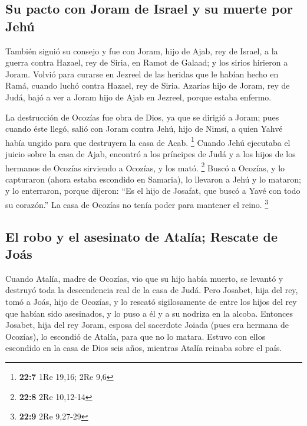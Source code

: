 \begin{paracol}{2}
{\subsection{Su pacto con Joram de Israel y su muerte por
Jehú}\label{su-pacto-con-joram-de-israel-y-su-muerte-por-jehuxfa}}

 También siguió su consejo y fue con Joram, hijo de Ajab,
rey de Israel, a la guerra contra Hazael, rey de Siria, en Ramot de
Galaad; y los sirios hirieron a Joram.  Volvió para
curarse en Jezreel de las heridas que le habían hecho en Ramá, cuando
luchó contra Hazael, rey de Siria. Azarías hijo de Joram, rey de Judá,
bajó a ver a Joram hijo de Ajab en Jezreel, porque estaba enfermo.

 La destrucción de Ocozías fue obra de Dios, ya que se
dirigió a Joram; pues cuando éste llegó, salió con Joram contra Jehú,
hijo de Nimsí, a quien Yahvé había ungido para que destruyera la casa de
Acab. \footnote{\textbf{22:7} 1Re 19,16; 2Re 9,6}  Cuando
Jehú ejecutaba el juicio sobre la casa de Ajab, encontró a los príncipes
de Judá y a los hijos de los hermanos de Ocozías sirviendo a Ocozías, y
los mató. \footnote{\textbf{22:8} 2Re 10,12-14}  Buscó a
Ocozías, y lo capturaron (ahora estaba escondido en Samaria), lo
llevaron a Jehú y lo mataron; y lo enterraron, porque dijeron: ``Es el
hijo de Josafat, que buscó a Yavé con todo su corazón.'' La casa de
Ocozías no tenía poder para mantener el reino. \footnote{\textbf{22:9}
  2Re 9,27-29}

\hypertarget{el-robo-y-el-asesinato-de-ataluxeda-rescate-de-jouxe1s}{%
\subsection{El robo y el asesinato de Atalía; Rescate de
Joás}\label{el-robo-y-el-asesinato-de-ataluxeda-rescate-de-jouxe1s}}

 Cuando Atalía, madre de Ocozías, vio que su hijo había
muerto, se levantó y destruyó toda la descendencia real de la casa de
Judá.  Pero Josabet, hija del rey, tomó a Joás, hijo de
Ocozías, y lo rescató sigilosamente de entre los hijos del rey que
habían sido asesinados, y lo puso a él y a su nodriza en la alcoba.
Entonces Josabet, hija del rey Joram, esposa del sacerdote Joiada (pues
era hermana de Ocozías), lo escondió de Atalía, para que no lo matara.
 Estuvo con ellos escondido en la casa de Dios seis años,
mientras Atalía reinaba sobre el país.


\end{paracol}

